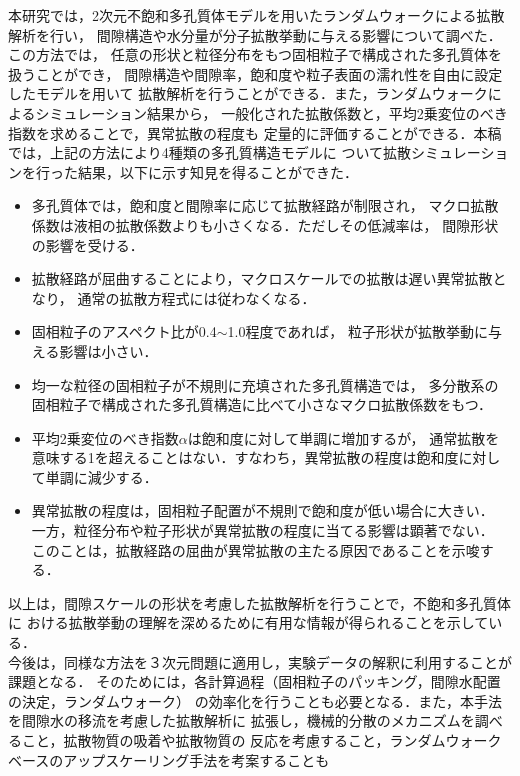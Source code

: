 \documentclass{jsce}
\begin{document}
本研究では，2次元不飽和多孔質体モデルを用いたランダムウォークによる拡散解析を行い，
間隙構造や水分量が分子拡散挙動に与える影響について調べた．この方法では，
任意の形状と粒径分布をもつ固相粒子で構成された多孔質体を扱うことができ，
間隙構造や間隙率，飽和度や粒子表面の濡れ性を自由に設定したモデルを用いて
拡散解析を行うことができる．また，ランダムウォークによるシミュレーション結果から，
一般化された拡散係数と，平均2乗変位のべき指数を求めることで，異常拡散の程度も
定量的に評価することができる．本稿では，上記の方法により4種類の多孔質構造モデルに
ついて拡散シミュレーションを行った結果，以下に示す知見を得ることができた．
\begin{itemize}
\item
	多孔質体では，飽和度と間隙率に応じて拡散経路が制限され，
	マクロ拡散係数は液相の拡散係数よりも小さくなる．ただしその低減率は，
	間隙形状の影響を受ける．
\item
	拡散経路が屈曲することにより，マクロスケールでの拡散は遅い異常拡散となり，
	通常の拡散方程式には従わなくなる．
\item
	固相粒子のアスペクト比が0.4$\sim$1.0程度であれば，
	粒子形状が拡散挙動に与える影響は小さい．
\item
	均一な粒径の固相粒子が不規則に充填された多孔質構造では，
	多分散系の固相粒子で構成された多孔質構造に比べて小さなマクロ拡散係数をもつ．
\item
	平均2乗変位のべき指数$\alpha$は飽和度に対して単調に増加するが，
	通常拡散を意味する1を超えることはない．すなわち，異常拡散の程度は飽和度に対して単調に減少する．
\item
	異常拡散の程度は，固相粒子配置が不規則で飽和度が低い場合に大きい．
	一方，粒径分布や粒子形状が異常拡散の程度に当てる影響は顕著でない．
	このことは，拡散経路の屈曲が異常拡散の主たる原因であることを示唆する．
\end{itemize}
以上は，間隙スケールの形状を考慮した拡散解析を行うことで，不飽和多孔質体に
おける拡散挙動の理解を深めるために有用な情報が得られることを示している．\\
\hspace{\parindent}
今後は，同様な方法を３次元問題に適用し，実験データの解釈に利用することが課題となる．
そのためには，各計算過程（固相粒子のパッキング，間隙水配置の決定，ランダムウォーク）
の効率化を行うことも必要となる．また，本手法を間隙水の移流を考慮した拡散解析に
拡張し，機械的分散のメカニズムを調べること，拡散物質の吸着や拡散物質の
反応を考慮すること，ランダムウォークベースのアップスケーリング手法を考案することも
\end{document}
